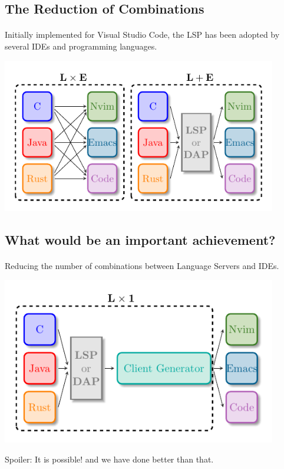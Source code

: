 \documentclass[9pt,xcolor=table,svgnames]{beamer}
\begin{document}
\subsection[The Reductions of Combinations]{The Reduction of Combinations}
\begin{frame}{\secname}
    \framesubtitle{\subsecname}

    Initially implemented for Visual Studio Code, the LSP has been adopted by several \alert{IDEs} and \alert{programming languages}.

    \pause
    \begin{center}
    \includegraphics[width=0.9\textwidth]{figs/lsp-combination.pdf}
    \end{center}
\end{frame}

\subsection[An Achievement]{What would be an important achievement?}
\begin{frame}{\secname}
    \framesubtitle{\subsecname}

    Reducing the number of combinations between \alert{Language Servers} and \alert{IDEs}.

    \pause

    \begin{center}
    \includegraphics[width=0.9\textwidth]{figs/lsp-combination-lx1.pdf}
    \end{center}

    \pause
    \huge Spoiler:
    \normalsize \alert{It is possible!} and we have done better than that.
\end{frame}
\end{document}
